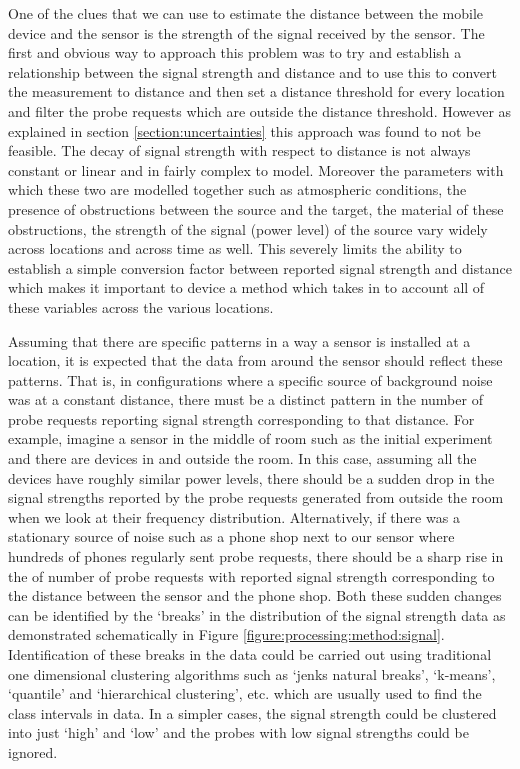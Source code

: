 One of the clues that we can use to estimate the distance between the mobile device and the sensor is the strength of the signal received by the sensor.
The first and obvious way to approach this problem was to try and establish a relationship between the signal strength and distance and to use this to convert the measurement to distance and then set a distance threshold for every location and filter the probe requests which are outside the distance threshold.
However as explained in section \ref{section:uncertainties} this approach was found to not be feasible.
The decay of signal strength with respect to distance is not always constant or linear and in fairly complex to model.
Moreover the parameters with which these two are modelled together such as atmospheric conditions, the presence of obstructions between the source and the target, the material of these obstructions, the strength of the signal (power level) of the source vary widely across locations and across time as well.
This severely limits the ability to establish a simple conversion factor between reported signal strength and distance which makes it important to device a method which takes in to account all of these variables across the various locations.

Assuming that there are specific patterns in a way a sensor is installed at a location, it is expected that the data from around the sensor should reflect these patterns.
That is, in configurations where a specific source of background noise was at a constant distance, there must be a distinct pattern in the number of probe requests reporting signal strength corresponding to that distance.
For example, imagine a sensor in the middle of room such as the initial experiment and there are devices in and outside the room.
In this case, assuming all the devices have roughly similar power levels, there should be a sudden drop in the signal strengths reported by the probe requests generated from outside the room when we look at their frequency distribution.
Alternatively, if there was a stationary source of noise such as a phone shop next to our sensor where hundreds of phones regularly sent probe requests, there should be a sharp rise in the of number of probe requests with reported signal strength corresponding to the distance between the sensor and the phone shop.
Both these sudden changes can be identified by the `breaks' in the distribution of the signal strength data as demonstrated schematically in Figure \ref{figure:processing:method:signal}.
Identification of these breaks in the data could be carried out using traditional one dimensional clustering algorithms such as `jenks natural breaks', `k-means', `quantile' and `hierarchical clustering', etc. which are usually used to find the class intervals in data.
In a simpler cases, the signal strength could be clustered into just `high' and `low' and the probes with low signal strengths could be ignored.

